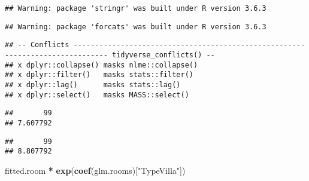 \documentclass[
]{article}
\newenvironment{Shaded}{\begin{snugshade}}{\end{snugshade}}
\newcommand{\CommentTok}[1]{\textcolor[rgb]{0.56,0.35,0.01}{\textit{#1}}}
\newcommand{\DataTypeTok}[1]{\textcolor[rgb]{0.13,0.29,0.53}{#1}}
\newcommand{\DecValTok}[1]{\textcolor[rgb]{0.00,0.00,0.81}{#1}}
\newcommand{\KeywordTok}[1]{\textcolor[rgb]{0.13,0.29,0.53}{\textbf{#1}}}
\newcommand{\NormalTok}[1]{#1}
\newcommand{\OperatorTok}[1]{\textcolor[rgb]{0.81,0.36,0.00}{\textbf{#1}}}
\newcommand{\StringTok}[1]{\textcolor[rgb]{0.31,0.60,0.02}{#1}}
\begin{document}
\begin{verbatim}
## Warning: package 'stringr' was built under R version 3.6.3
\end{verbatim}

\begin{verbatim}
## Warning: package 'forcats' was built under R version 3.6.3
\end{verbatim}

\begin{verbatim}
## -- Conflicts ------------------------------------------------------------------------------ tidyverse_conflicts() --
## x dplyr::collapse() masks nlme::collapse()
## x dplyr::filter()   masks stats::filter()
## x dplyr::lag()      masks stats::lag()
## x dplyr::select()   masks MASS::select()
\end{verbatim}

\begin{Shaded}
\end{Shaded}

\begin{verbatim}
##       99 
## 7.607792
\end{verbatim}

\begin{Shaded}
\end{Shaded}

\begin{verbatim}
##       99 
## 8.807792
\end{verbatim}

\begin{Shaded}
\begin{Highlighting}[]
\NormalTok{fitted.room }\OperatorTok{*}\StringTok{ }\KeywordTok{exp}\NormalTok{(}\KeywordTok{coef}\NormalTok{(glm.rooms)[}\StringTok{"TypeVilla"}\NormalTok{])}
\end{Highlighting}
\end{Shaded}
\end{document}
